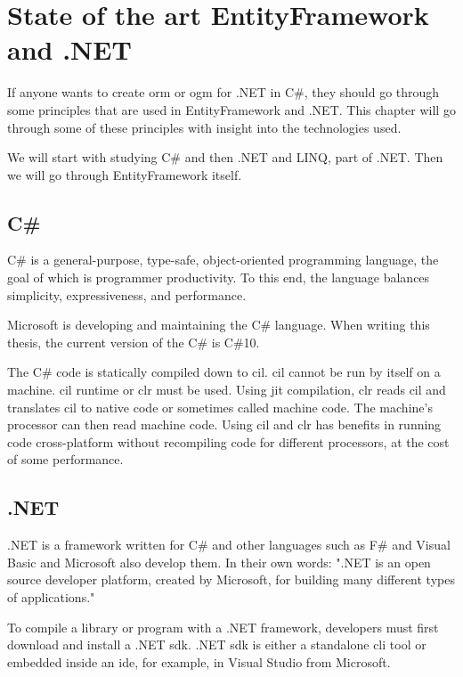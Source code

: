 \chapter {State of the art EntityFramework and .NET}

If anyone wants to create \acrshort{orm} or \acrshort{ogm} for .NET in C\#, they should go through some principles that are used in
EntityFramework and .NET. This chapter will go through some of these principles with insight into the technologies used.

We will start with studying C\# and then .NET and LINQ, part of .NET. Then we will go through EntityFramework itself.

\section {C\#}
C\# is a general-purpose, type-safe, object-oriented programming language, the goal of which is programmer productivity.
To this end, the language balances simplicity, expressiveness,
and performance. \cite{albahari_c_2019}

Microsoft is developing and maintaining the C\# language. When writing this thesis, the current version of the C\# is C\#10.

The C\# code is statically compiled down to \acrlong{cil}. \acrshort{cil} cannot be run by itself on a machine.
\acrshort{cil} runtime or \acrfull{clr} must be used. Using \acrfull{jit} compilation, \acrshort{clr} reads \acrshort{cil} and translates \acrshort{cil} to native
code or sometimes called machine code. The machine's processor can then read machine code. Using \acrshort{cil} and \acrshort{clr} has benefits in running code
cross-platform without recompiling code for different processors, at the cost of some performance. \cite{rodenburg_code_2021}

\section {.NET}

.NET is a framework written for C\# and other languages such as F\# and
Visual Basic and Microsoft also develop them.
In their own words: ".NET is an open source developer
platform, created by Microsoft, for building many different types of applications." \cite{noauthor_what_nodate-2}

To compile a library or program with a .NET framework,
developers must first download and install a .NET \acrfull{sdk}.
.NET \acrfull{sdk} is either a standalone \acrfull{cli} tool or embedded inside an \acrshort{ide},
for example, in Visual Studio from Microsoft.


